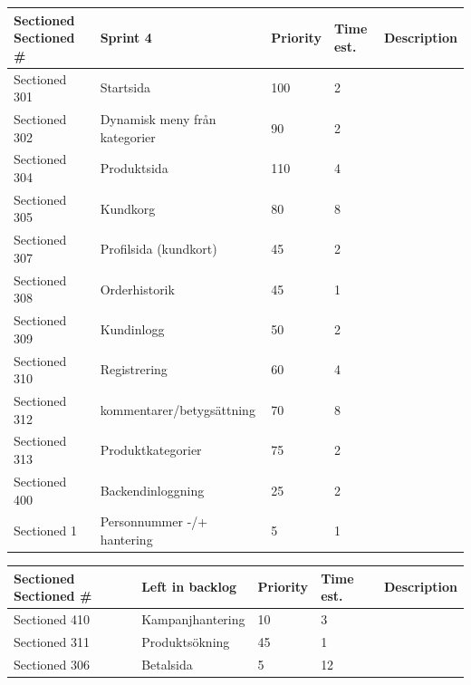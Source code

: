 \documentclass[paper=a4, fontsize=11pt]{report} %
\begin{document}
\begin{itemize}
	\begin{tabular}{|l|l|l|l|l|}
		Sectioned\hline
		Sectioned \#  & Sprint 4                      & Priority & Time est. & Description \\ \hline
		Sectioned 301 & Startsida                     & 100      & 2         &             \\ \hline
		Sectioned 302 & Dynamisk meny från kategorier & 90       & 2         &             \\ \hline
		Sectioned 304 & Produktsida                   & 110      & 4         &             \\ \hline
		Sectioned 305 & Kundkorg                      & 80       & 8         &             \\ \hline
		Sectioned 307 & Profilsida (kundkort)         & 45       & 2         &             \\ \hline
		Sectioned 308 & Orderhistorik                 & 45       & 1         &             \\ \hline
		Sectioned 309 & Kundinlogg                    & 50       & 2         &             \\ \hline
		Sectioned 310 & Registrering                  & 60       & 4         &             \\ \hline
		Sectioned 312 & kommentarer/betygsättning     & 70       & 8         &             \\ \hline
		Sectioned 313 & Produktkategorier             & 75       & 2         &             \\ \hline
		Sectioned 400 & Backendinloggning             & 25       & 2         &             \\ \hline
		Sectioned 1   & Personnummer -/+ hantering    & 5        & 1         &             \\ \hline
	\end{tabular}

	\begin{tabular}{|l|l|l|l|l|}
		Sectioned \hline
		Sectioned \#  & Left in backlog  & Priority & Time est. & Description \\ \hline
		Sectioned 410 & Kampanjhantering & 10       & 3         &             \\ \hline
		Sectioned 311 & Produktsökning   & 45       & 1         &             \\ \hline
		Sectioned 306 & Betalsida        & 5        & 12        &             \\ \hline
	\end{tabular}



\end{itemize}
\end{document}
